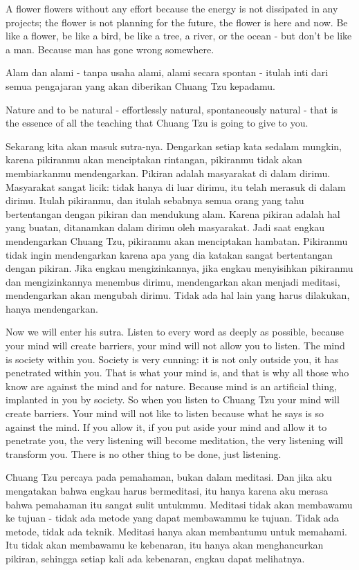 \english
A flower flowers without any effort because the energy is not dissipated in any projects; the flower is not planning for the future, the flower is here and now. Be like a flower, be like a bird, be like a tree, a river, or the ocean - but don't be like a man. Because man has gone wrong somewhere.

\bahasa
Alam dan alami - tanpa usaha alami, alami secara spontan - itulah inti dari semua pengajaran yang akan diberikan Chuang Tzu kepadamu.

\english
Nature and to be natural - effortlessly natural, spontaneously natural - that is the essence of all the teaching that Chuang Tzu is going to give to you.

\bahasa
Sekarang kita akan masuk sutra-nya. Dengarkan setiap kata sedalam mungkin, karena pikiranmu akan menciptakan rintangan, pikiranmu tidak akan membiarkanmu mendengarkan. Pikiran adalah masyarakat di dalam dirimu. Masyarakat sangat licik: tidak hanya di luar dirimu, itu telah merasuk di dalam dirimu. Itulah pikiranmu, dan itulah sebabnya semua orang yang tahu bertentangan dengan pikiran dan mendukung alam. Karena pikiran adalah hal yang buatan, ditanamkan dalam dirimu oleh masyarakat. Jadi saat engkau mendengarkan Chuang Tzu, pikiranmu akan menciptakan hambatan. Pikiranmu tidak ingin mendengarkan karena apa yang dia katakan sangat bertentangan dengan pikiran. Jika engkau mengizinkannya, jika engkau menyisihkan pikiranmu dan mengizinkannya menembus dirimu, mendengarkan akan menjadi meditasi, mendengarkan akan mengubah dirimu. Tidak ada hal lain yang harus dilakukan, hanya mendengarkan.

\english
Now we will enter his sutra. Listen to every word as deeply as possible, because your mind will create barriers, your mind will not allow you to listen. The mind is society within you. Society is very cunning: it is not only outside you, it has penetrated within you. That is what your mind is, and that is why all those who know are against the mind and for nature. Because mind is an artificial thing, implanted in you by society. So when you listen to Chuang Tzu your mind will create barriers. Your mind will not like to listen because what he says is so against the mind. If you allow it, if you put aside your mind and allow it to penetrate you, the very listening will become meditation, the very listening will transform you. There is no other thing to be done, just listening.

\bahasa
Chuang Tzu percaya pada pemahaman, bukan dalam meditasi. Dan jika aku mengatakan bahwa engkau harus bermeditasi, itu hanya karena aku merasa bahwa pemahaman itu sangat sulit untukmmu. Meditasi tidak akan membawamu ke tujuan - tidak ada metode yang dapat membawammu ke tujuan. Tidak ada metode, tidak ada teknik. Meditasi hanya akan membantumu untuk memahami. Itu tidak akan membawamu ke kebenaran, itu hanya akan menghancurkan pikiran, sehingga setiap kali ada kebenaran, engkau dapat melihatnya.

